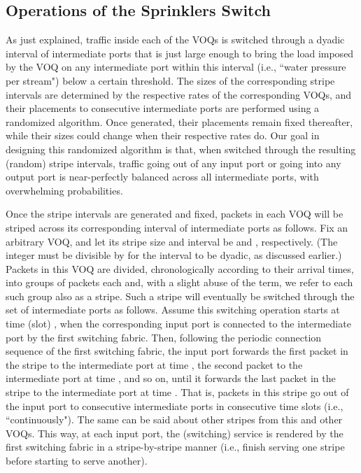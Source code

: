 \subsection{Operations of the Sprinklers Switch}


As just explained, traffic inside each of the  VOQs is switched through
a dyadic interval of intermediate ports that is just large enough to bring the load imposed by the VOQ on any intermediate port 
within this interval (i.e., ``water pressure per stream") below a certain threshold.  
The sizes of the corresponding  stripe intervals are determined by the respective rates of the corresponding VOQs,
and their placements to consecutive intermediate ports are performed using a randomized algorithm.
Once generated, their placements remain fixed thereafter, while their sizes 
could change when their respective rates do.
Our goal in designing this randomized algorithm is that, 
when switched through the resulting (random) stripe intervals,  
traffic going out of any input port or going into any output port is near-perfectly balanced 
across all  intermediate ports, with overwhelming probabilities.  


Once the  stripe intervals are generated and fixed, packets in each VOQ will be striped across its
corresponding interval of intermediate ports as follows.  
Fix an arbitrary VOQ, and let its stripe size and interval be  and , respectively.
(The integer  must be divisible by  for the interval to be dyadic, as discussed earlier.)
Packets in this VOQ are divided, chronologically according to their arrival times, 
into groups of  packets each and,
with a slight abuse of the term, we refer to each such group also as a stripe.  Such a
stripe will eventually be switched through the set of intermediate ports 
as follows. Assume this switching operation starts at time (slot) , when the corresponding input port 
is connected to the intermediate port  by the first switching fabric.  Then, following the periodic connection 
sequence of the first switching fabric, the input port forwards the first packet in the stripe to 
the intermediate port  at time , the second packet to the intermediate port  at time , and so on,
until it forwards the last packet in the stripe to the intermediate port  at time .  That is, packets in this stripe
go out of the input port to consecutive intermediate ports in consecutive time slots (i.e., ``continuously").  The same can be said about other stripes from this and other VOQs.
This way, at each input port, the (switching) service is rendered by the first switching fabric in a stripe-by-stripe manner (i.e., finish serving 
one stripe before starting to serve another).   









